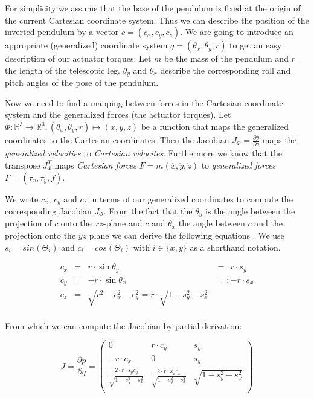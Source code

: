 \documentclass[english,ngerman]{KITreprt}
\begin{document}
For simplicity we assume that the base of the pendulum is fixed at the
origin of the current Cartesian coordinate system. Thus we can describe
the position of the inverted pendulum by a vector $c = (c_x, c_y, c_z)$.
We are going to introduce an appropriate (generalized) coordinate system
$q = (\theta_x, \theta_y, r)$ to get an easy description of our actuator
torques: Let $m$ be the mass of the pendulum and $r$ the length of the
telescopic leg. $\theta_y$ and $\theta_x$ describe the corresponding
roll and pitch angles of the pose of the pendulum.

Now we need to find a mapping between forces in the Cartesian coordinate
system and the generalized forces (the actuator torques). Let
$\Phi: \mathbb{R}^3 \longrightarrow \mathbb{R}^3, (\theta_x, \theta_y, r) \mapsto (x, y, z)$
be a function that maps the generalized coordinates to the Cartesian
coordinates. Then the Jacobian $J_\Phi = \frac{\partial p}{\partial q}$
maps the \emph{generalized velocities} to \emph{Cartesian velocites}.
Furthermore we know that the transpose $J_\Phi^T$ maps \emph{Cartesian
forces} $F = m (\ddot x, \ddot y, \ddot z)$ to \emph{generalized forces}
$\Gamma = (\tau_x, \tau_y, f)$.

We write $c_x$, $c_y$ and $c_z$ in terms of our generalized coordinates
to compute the corresponding Jacobian $J_\Phi$. From the fact that the
$\theta_y$ is the angle between the projection of $c$ onto the
$xz$-plane and $c$ and $\theta_x$ the angle between $c$ and the
projection onto the $yz$ plane we can derive the following equations
\cite{kajita20013d}. We use $s_i = sin(\Theta_i)$ and
$c_i = cos(\Theta_i)$ with $i \in \{x, y\}$ as a shorthand notation.

\begin{equation}
\begin{array}{lcll} \label{eq:lip-xyz}
c_x & = & r \cdot \sin \theta_y & =: r \cdot s_y\\
c_y & = & -r \cdot \sin \theta_x & =: -r \cdot s_x \\
c_z & = & \sqrt{r^2 - c_x^2 - c_y^2} = r \cdot \sqrt{1 - s_y^2 - s_x^2} & \\
\end{array}
\end{equation}

From which we can compute the Jacobian by partial derivation:

\begin{equation} \label{eq:lip-Jacobian}
J = \frac{\partial p}{\partial q} = \left( \begin{array}{rcl}
0 & r \cdot c_y & s_y \\
-r \cdot c_x & 0 & s_y \\
\frac{2 \cdot r \cdot s_y c_y}{\sqrt{1 - s_y^2 - s_x^2}} & \frac{2 \cdot r \cdot s_x c_x}{\sqrt{1 - s_y^2 - s_x^2}} & \sqrt{1 - s_y^2 - s_x^2}\\
\end{array}
\right)
\end{equation}
\end{document}
